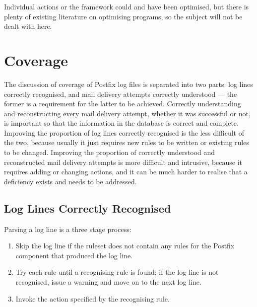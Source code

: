 Individual actions or the framework could and have been optimised, but
there is plenty of existing literature on optimising programs, so the
subject will not be dealt with here.



\FloatBarrier{}

\section{Coverage}

\label{parsing coverage}

The discussion of \parsernames{} coverage of Postfix log files is separated
into two parts: log lines correctly recognised, and mail delivery attempts
correctly understood --- the former is a requirement for the latter to be
achieved.  Correctly understanding and reconstructing every mail delivery
attempt, whether it was successful or not, is important so that the
information in the database is correct and complete.  Improving the
proportion of log lines correctly recognised is the less difficult of the
two, because usually it just requires new rules to be written or existing
rules to be changed.  Improving the proportion of correctly understood and
reconstructed mail delivery attempts is more difficult and intrusive,
because it requires adding or changing actions, and it can be much harder
to realise that a deficiency exists and needs to be addressed.

\subsection{Log Lines Correctly Recognised}

\label{log-lines-covered}

Parsing a log line is a three stage process:

\begin{enumerate}

    \squeezeitems{}

    \item Skip the log line if the ruleset does not contain any rules for
        the Postfix component that produced the log line.

    \item Try each rule until a recognising rule is found; if the log line
        is not recognised, issue a warning and move on to the next log
        line.

    \item Invoke the action specified by the recognising rule.

\end{enumerate}

